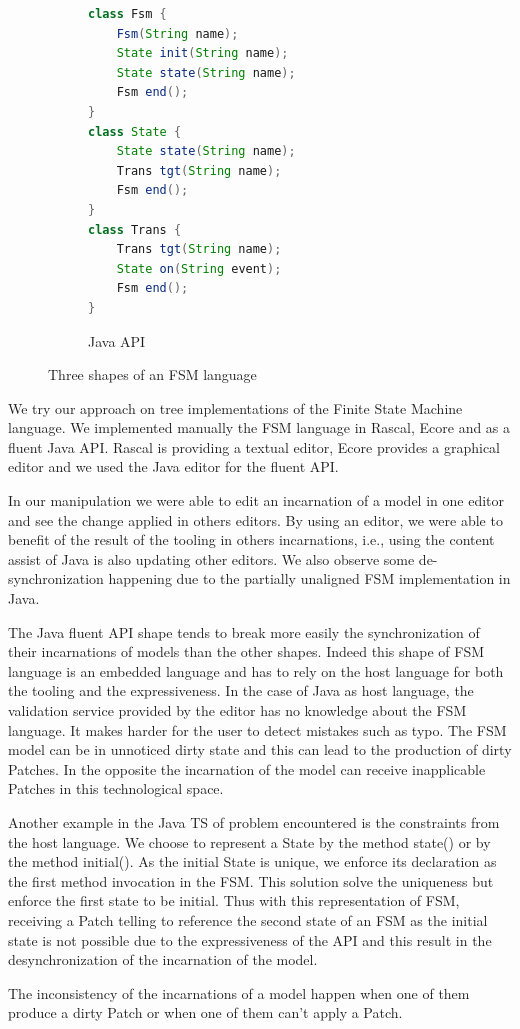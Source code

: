 \begin{figure}[bt]
	\enskip
	\vrule
	\enskip
	\begin{subfigure}[b]{.35\columnwidth}
		\begin{lstlisting}[label=lst:fsm-api, language=Java, numbers=none, xleftmargin=0pt, tabsize=1]
class Fsm {
	Fsm(String name);
	State init(String name);
	State state(String name);
	Fsm end();
}
class State {
	State state(String name);
	Trans tgt(String name);
	Fsm end();
}
class Trans {
	Trans tgt(String name);
	State on(String event);
	Fsm end();
}
		\end{lstlisting}
		\caption{Java API}
	\end{subfigure}
	\caption{Three shapes of an FSM language}
\end{figure}


We try our approach on tree implementations of the Finite State Machine language.
We implemented manually the FSM language in Rascal, Ecore and as a fluent Java API.
Rascal is providing a textual editor, Ecore provides a graphical editor and we used the Java editor for the fluent API.

In our manipulation we were able to edit an incarnation of a model in one editor and see the change applied in others editors.
By using an editor, we were able to benefit of the result of the tooling in others incarnations, i.e., using the content assist of Java is also updating other editors.
We also observe some de-synchronization happening due to the partially unaligned FSM implementation in Java.

The Java fluent API shape tends to break more easily the synchronization of their incarnations of models than the other shapes.
Indeed this shape of FSM language is an embedded language and has to rely on the host language for both the tooling and the expressiveness.
In the case of Java as host language, the validation service provided by the editor has no knowledge about the FSM language.
It makes harder for the user to detect mistakes such as typo. The FSM model can be in unnoticed dirty state and this can lead to the production of dirty Patches.
In the opposite the incarnation of the model can receive inapplicable Patches in this technological space.

Another example in the Java TS of problem encountered is the constraints from the host language.
We choose to represent a State by the method state() or by the method initial().
As the initial State is unique, we enforce its declaration as the first method invocation in the FSM.
This solution solve the uniqueness but enforce the first state to be initial.
Thus with this representation of FSM, receiving a Patch telling to reference the second state of an FSM as the initial state is not possible due to the expressiveness of the API and this result in the desynchronization of the incarnation of the model.

The inconsistency of the incarnations of a model happen when one of them produce a dirty Patch or when one of them can't apply a Patch.

